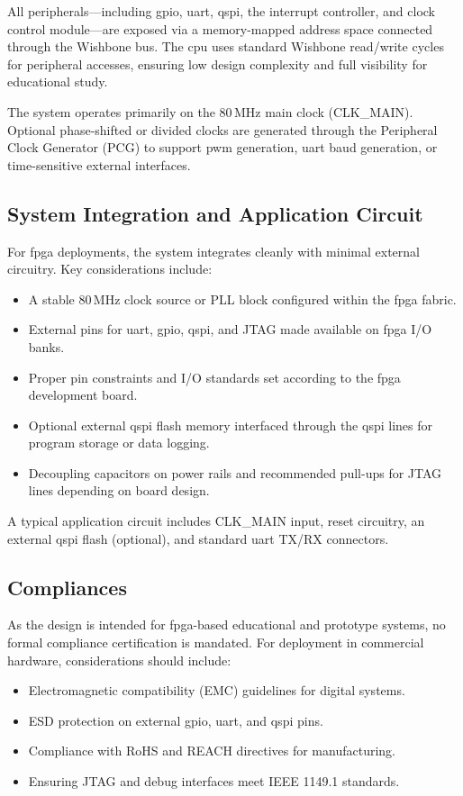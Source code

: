 \begin{itemize}
All peripherals—including \gls{gpio}, \gls{uart}, \gls{qspi}, the interrupt controller, and clock control module—are exposed via a memory-mapped address space connected through the Wishbone bus. The \gls{cpu} uses standard Wishbone read/write cycles for peripheral accesses, ensuring low design complexity and full visibility for educational study.

The system operates primarily on the 80\,MHz main clock (CLK\_MAIN). Optional phase-shifted or divided clocks are generated through the Peripheral Clock Generator (PCG) to support \gls{pwm} generation, \gls{uart} baud generation, or time-sensitive external interfaces.

\subsection{System Integration and Application Circuit}

For \gls{fpga} deployments, the system integrates cleanly with minimal external circuitry. Key considerations include:
\begin{itemize}
  \item A stable 80\,MHz clock source or PLL block configured within the \gls{fpga} fabric.
  \item External pins for \gls{uart}, \gls{gpio}, \gls{qspi}, and JTAG made available on \gls{fpga} I/O banks.
  \item Proper pin constraints and I/O standards set according to the \gls{fpga} development board.
  \item Optional external \gls{qspi} flash memory interfaced through the \gls{qspi} lines for program storage or data logging.
  \item Decoupling capacitors on power rails and recommended pull-ups for JTAG lines depending on board design.
\end{itemize}

A typical application circuit includes CLK\_MAIN input, reset circuitry, an external \gls{qspi} flash (optional), and standard \gls{uart} TX/RX connectors.

\subsection{Compliances} 

As the design is intended for \gls{fpga}-based educational and prototype systems, no formal compliance certification is mandated. For deployment in commercial hardware, considerations should include:
\begin{itemize}
  \item Electromagnetic compatibility (EMC) guidelines for digital systems.
  \item ESD protection on external \gls{gpio}, \gls{uart}, and \gls{qspi} pins.
  \item Compliance with RoHS and REACH directives for manufacturing.
  \item Ensuring JTAG and debug interfaces meet IEEE 1149.1 standards.
\end{itemize}


\end{itemize}
